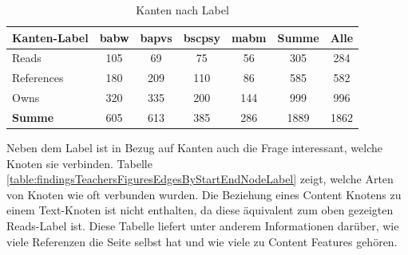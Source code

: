     \begin{table}[htb]
        \centering
        \begin{tabular}{|l|c|c|c|c|c|c|}
            \hline
            \multicolumn{1}{|c|}{\textbf{Kanten-Label}} & \textbf{\gls{babw}} & \textbf{\gls{bapvs}} & \textbf{\gls{bscpsy}} & \textbf{\gls{mabm}} & \textbf{Summe} & \textbf{Alle} \\ \hline
            Reads                                       & 105           & 69             & 75              & 56            & 305            & 284           \\ \hline
            References                                  & 180           & 209            & 110             & 86            & 585            & 582           \\ \hline
            Owns                                        & 320           & 335            & 200             & 144           & 999            & 996           \\ \hline
            \hline
            \textbf{Summe}                              & 605           & 613            & 385             & 286           & 1889           & 1862          \\ \hline
        \end{tabular}
        \caption{Kanten nach Label}
        \label{table:findingTeachersFiguresEdgesByLabel}
    \end{table}

    Neben dem Label ist in Bezug auf Kanten auch die Frage interessant,
    welche Knoten sie verbinden.
    Tabelle \ref{table:findingsTeachersFiguresEdgesByStartEndNodeLabel}
    zeigt, welche Arten von Knoten wie oft verbunden wurden.
    Die Beziehung eines Content Knotens zu einem Text-Knoten ist nicht enthalten,
    da diese äquivalent zum oben gezeigten Reads-Label ist.
    Diese Tabelle liefert unter anderem Informationen darüber,
    wie viele Referenzen die Seite selbst hat und wie viele zu Content Features gehören.

